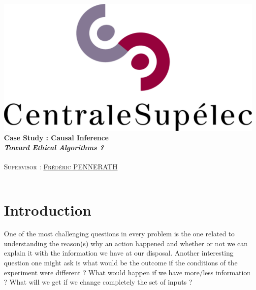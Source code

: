 \documentclass{article}
\author{\Large \textsc{\href{mailto:mohammed.fellaji@supelec.fr}{Mohammed FELLAJI}, \href{mailto:ahmed.benaissa@supelec.fr}{Ahmed BEN AISSA}}}
\date{September, 2020}
\begin{document}
\hypersetup{pdfborder=0 0 0} 		

\makeatletter
  \begin{titlepage}
  \centering
     {\large \textsc{   }}\\
     \vspace{1em}
    \centering
      \includegraphics[width=0.5 \textwidth]{figures/LogoCS.png} \\
    \vspace{4cm}
      {\LARGE\textbf{Case Study : Causal Inference}\\  
       \vspace{1em}
       {\large\textbf{
       \textit{\LARGE{Toward Ethical Algorithms ?}}}}\\  
    \vspace{4cm}
    \centering
     {\Large \@author} \\
     \vspace{1em}
        {\Large \textsc{Supervisor : \href{mailto:frederic.pennerath@centralesupelec.fr}{Frédéric PENNERATH}}}\\
        \vspace{3em}
        {\Large \@date} }\\
  \end{titlepage}
 
 
\makeatother

\tableofcontents





\newpage
\section{Introduction}
One of the most challenging questions in every problem is the one related to understanding the reason(s) why an action happened and whether or not we can explain it with the information we have at our disposal. Another interesting question one might ask is what would be the outcome if the conditions of the experiment were different ? What would happen if we have more/less information ? What will we get if we change completely the set of inputs ?
\end{document}
